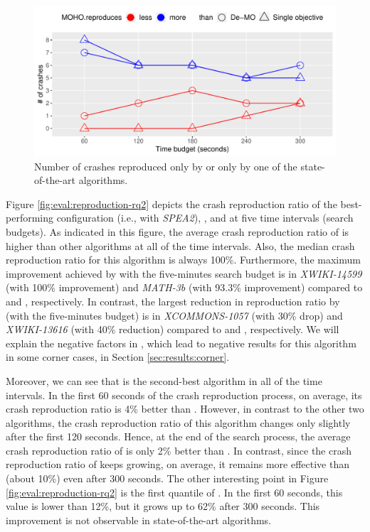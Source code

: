 \begin{figure}[t]
    \centering
    \includegraphics[width=\linewidth]{papers/moho/figures/rq2-reproduced-crashes.pdf}
    \caption{Number of crashes reproduced only by \moho or only by one of the state-of-the-art algorithms.}
    \label{fig:eval:results-rq2}
\end{figure}

Figure \ref{fig:eval:reproduction-rq2} depicts the crash reproduction ratio of the best-performing \moho configuration (i.e., with \textit{SPEA2}), \SGGA, and \decomposition at five time intervals (search budgets). As indicated in this figure, the average crash reproduction ratio of \moho is higher than other algorithms at all of the time intervals. Also, the median crash reproduction ratio for this algorithm is always 100\%. Furthermore, the maximum improvement achieved by \moho with the five-minutes search budget is in \textit{XWIKI-14599} (with 100\% improvement) and \textit{MATH-3b} (with 93.3\% improvement) compared to \SGGA and \decomposition, respectively. In contrast, the largest reduction in reproduction ratio by \moho (with the five-minutes budget) is in \textit{XCOMMONS-1057} (with 30\% drop) and \textit{XWIKI-13616} (with 40\% reduction) compared to \SGGA and \decomposition, respectively. We will explain the negative factors in \moho, which lead to negative results for this algorithm in some corner cases, in Section \ref{sec:results:corner}.
 
Moreover, we can see that \decomposition is the second-best algorithm in all of the time intervals. In the first 60 seconds of the crash reproduction process, on average, its crash reproduction ratio is 4\% better than \SGGA. However, in contrast to the other two algorithms, the crash reproduction ratio of this algorithm changes only slightly after the first 120 seconds. Hence, at the end of the search process, the average crash reproduction ratio of \decomposition is only 2\% better than \SGGA. In contrast, since the crash reproduction ratio of \moho keeps growing, on average, it remains more effective than \SGGA (about 10\%) even after 300 seconds. The other interesting point in Figure \ref{fig:eval:reproduction-rq2} is the first quantile of \moho. In the first 60 seconds, this value is lower than 12\%, but it grows up to 62\% after 300 seconds. This improvement is not observable in state-of-the-art algorithms.

